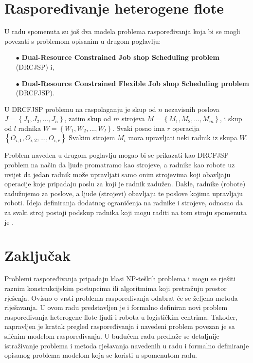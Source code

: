 \documentclass[times, utf8, seminar]{fer}
\begin{document}
\chapter{Raspoređivanje heterogene flote}
U radu \citep{dhiflaoui2018dual} spomenuta su još dva modela problema raspoređivanja koja
bi se mogli povezati s problemom opisanim u drugom poglavlju:
\begin{itemize}
    \item[$\bullet$] \textbf{Dual-Resource Constrained Job shop Scheduling problem} (DRCJSP) i,
    \item[$\bullet$] \textbf{Dual-Resource Constrained Flexible Job shop Scheduling problem} (DRCFJSP). 
\end{itemize}

U DRCFJSP problemu na raspolaganju je skup od $n$ nezavisnih poslova $J = \left\{J_1, J_2, ..., J_n\right\}$,
zatim skup od $m$ strojeva $M = \left\{M_1, M_2, ..., M_m\right\}$, i skup od $l$ radnika $W = \left\{W_1, W_2, ..., W_l\right\}$.
Svaki posao ima $r$ operacija $\left\{O_{i,1}, O_{i,2}, ..., O_{i,r}\right\}$ Svakim strojem $M_i$
mora upravljati neki radnik iz skupa $W$.

Problem naveden u drugom poglavlju mogao bi se prikazati kao DRCFJSP problem na način da
ljude promatramo kao strojeve, a radnike kao robote uz uvijet da jedan radnik
može upravljati samo onim strojevima koji obavljaju operacije koje pripadaju
poslu za koji je radnik zadužen. Dakle, radnike (robote) zadužujemo
za poslove, a ljude (strojevi) obavljaju te poslove kojima upravljaju roboti.
Ideja definiranja dodatnog ograničenja na radnike i strojeve, odnosno
da za svaki stroj postoji podskup radnika koji mogu raditi na tom stroju
spomenuta je \citep{zheng2016knowledge}.

\chapter{Zaključak}
Problemi raspoređivanja pripadaju klasi NP-teških problema i mogu se rješiti
raznim konstrukcijskim postupcima ili algoritmima koji pretražuju prostor rješenja. Ovisno
o vrsti problema raspoređivanja odabrat će se željena metoda riješavanja.
U ovom radu predstavljen je i formalno definiran novi problem raspoređivanja heterogene flote
ljudi i robota u logističkim centrima.
Također, napravljen je kratak pregled raspoređivanja i navedeni problem
povezan je sa sličnim modelom raspoređivanja. U budućem radu predlaže se
detaljnije istraživanje problema i metoda rješavanja navedenih u radu \citep{dhiflaoui2018dual} i
formalno definiranje opisanog problema modelom koja se koristi u spomenutom radu.
\end{document}
